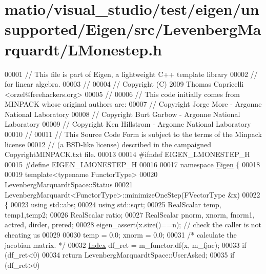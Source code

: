 \hypertarget{matio_2visual__studio_2test_2eigen_2unsupported_2_eigen_2src_2_levenberg_marquardt_2_l_monestep_8h_source}{}\section{matio/visual\+\_\+studio/test/eigen/unsupported/\+Eigen/src/\+Levenberg\+Marquardt/\+L\+Monestep.h}
\label{matio_2visual__studio_2test_2eigen_2unsupported_2_eigen_2src_2_levenberg_marquardt_2_l_monestep_8h_source}

\begin{DoxyCode}
00001 \textcolor{comment}{// This file is part of Eigen, a lightweight C++ template library}
00002 \textcolor{comment}{// for linear algebra.}
00003 \textcolor{comment}{//}
00004 \textcolor{comment}{// Copyright (C) 2009 Thomas Capricelli <orzel@freehackers.org>}
00005 \textcolor{comment}{//}
00006 \textcolor{comment}{// This code initially comes from MINPACK whose original authors are:}
00007 \textcolor{comment}{// Copyright Jorge More - Argonne National Laboratory}
00008 \textcolor{comment}{// Copyright Burt Garbow - Argonne National Laboratory}
00009 \textcolor{comment}{// Copyright Ken Hillstrom - Argonne National Laboratory}
00010 \textcolor{comment}{//}
00011 \textcolor{comment}{// This Source Code Form is subject to the terms of the Minpack license}
00012 \textcolor{comment}{// (a BSD-like license) described in the campaigned CopyrightMINPACK.txt file.}
00013 
00014 \textcolor{preprocessor}{#ifndef EIGEN\_LMONESTEP\_H}
00015 \textcolor{preprocessor}{#define EIGEN\_LMONESTEP\_H}
00016 
00017 \textcolor{keyword}{namespace }\hyperlink{namespace_eigen}{Eigen} \{
00018 
00019 \textcolor{keyword}{template}<\textcolor{keyword}{typename} FunctorType>
00020 LevenbergMarquardtSpace::Status
00021 LevenbergMarquardt<FunctorType>::minimizeOneStep(FVectorType  &x)
00022 \{
00023   \textcolor{keyword}{using} std::abs;
00024   \textcolor{keyword}{using} std::sqrt;
00025   RealScalar temp, temp1,temp2; 
00026   RealScalar ratio; 
00027   RealScalar pnorm, xnorm, fnorm1, actred, dirder, prered;
00028   eigen\_assert(x.size()==n); \textcolor{comment}{// check the caller is not cheating us}
00029 
00030   temp = 0.0; xnorm = 0.0;
00031   \textcolor{comment}{/* calculate the jacobian matrix. */}
00032   \hyperlink{namespace_eigen_a62e77e0933482dafde8fe197d9a2cfde}{Index} df\_ret = m\_functor.df(x, m\_fjac);
00033   \textcolor{keywordflow}{if} (df\_ret<0)
00034       \textcolor{keywordflow}{return} LevenbergMarquardtSpace::UserAsked;
00035   \textcolor{keywordflow}{if} (df\_ret>0)

\end{DoxyCode}
